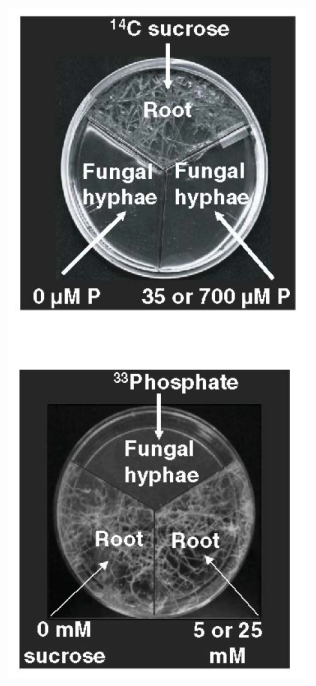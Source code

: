 \begin{noheadline}
\begin{frame}[t]
\begin{adjustwidth}{-2em}{-1.5em}
\begin{columns}[t]
            \includegraphics[width=\columnwidth]{fungus-plates.png}

        \end{columns}
    \end{adjustwidth}
\end{frame}
\end{noheadline}

